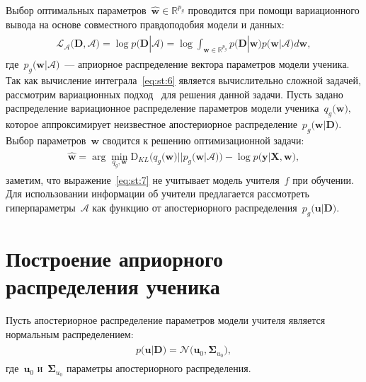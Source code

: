 \documentclass[12pt]{a&t}
\begin{document}
Выбор оптимальных параметров~$\hat{\mathbf{w}} \in \mathbb{R}^{p_g}$ проводится при помощи вариационного вывода на основе совместного правдоподобия модели и данных:
\begin{gather}
\label{eq:st:6}
\begin{aligned}
\mathcal{L}_{\mathcal{A}}\bigr(\mathbf{D}, \mathcal{A}\bigr) = \log p\bigr(\mathbf{D}|\mathcal{A}\bigr) = \log \int_{\mathbf{w} \in \mathbb{R}^{p_g}}p\bigr(\mathbf{D}|\mathbf{w}\bigr)p\bigr(\mathbf{w}|\mathcal{A}\bigr)d\mathbf{w},
\end{aligned}
\end{gather}
где~$p_g\bigr(\mathbf{w}| \mathcal{A}\bigr)$~--- априорное распределение вектора параметров модели ученика.
Так как вычисление интеграла~\eqref{eq:st:6} является вычислительно сложной задачей, рассмотрим вариационных подход~\cite{graves2011, grabovoy2019} для решения данной задачи. Пусть задано распределение вариационное распределение параметров модели ученика~$q_g\bigr(\mathbf{w}\bigr),$ которое аппроксимирует неизвестное апостериорное распределение~$p_g\bigr(\mathbf{w}|\mathbf{D}\bigr)$. Выбор параметров~$\mathbf{w}$ сводится к решению оптимизационной задачи:
\begin{gather}
\label{eq:st:7}
\begin{aligned}
\hat{\mathbf{w}} = \arg \min_{q_g, \mathbf{w}} \text{D}_{KL}\bigr(q_g\bigr(\mathbf{w}\bigr)||p_g\bigr(\mathbf{w}|\mathcal{A}\bigr)\bigr) - \log p\bigr(\mathbf{y}|\mathbf{X}, \mathbf{w}\bigr),
\end{aligned}
\end{gather}
заметим, что выражение~\eqref{eq:st:7} не учитывает модель учителя~$f$ при обучении. Для использовании информации об учители предлагается рассмотреть гиперпараметры~$\mathcal{A}$ как функцию от апостериорного распределения~$p_g\bigr(\mathbf{u}|\mathbf{D}\bigr)$.

\section{Построение априорного распределения ученика}
Пусть апостериорное распределение параметров модели учителя является нормальным распределением:
\begin{gather}
\label{eq:ap:1}
\begin{aligned}
p\bigr(\mathbf{u}|\mathbf{D}\bigr) = \mathcal{N}\bigr(\mathbf{u}_0, \bm{\Sigma}_{u_0}\bigr),
\end{aligned}
\end{gather}
где~$\mathbf{u}_0$ и~$\bm{\Sigma}_{u_0}$ параметры апостериорного распределения.
\end{document}
